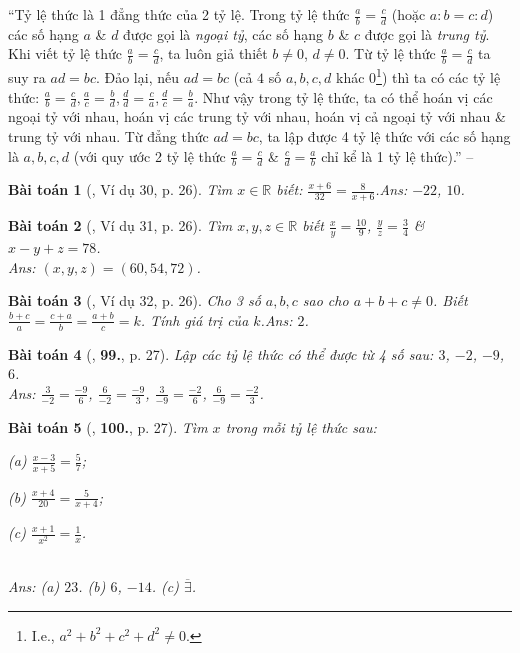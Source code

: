 \documentclass{article}
\numberwithin{equation}{section}
\newtheorem{baitoan}{Bài toán}
\begin{document}
``Tỷ lệ thức là 1 đẳng thức của 2 tỷ lệ. Trong tỷ lệ thức $\frac{a}{b} = \frac{c}{d}$ (hoặc $a:b = c:d$) các số hạng $a$ \& $d$ được gọi là \textit{ngoại tỷ}, các số hạng $b$ \& $c$ được gọi là \textit{trung tỷ}. Khi viết tỷ lệ thức $\frac{a}{b} = \frac{c}{d}$, ta luôn giả thiết $b\ne 0$, $d\ne 0$. Từ tỷ lệ thức $\frac{a}{b} = \frac{c}{d}$ ta suy ra $ad = bc$. Đảo lại, nếu $ad = bc$ (cả $4$ số $a,b,c,d$ khác $0$\footnote{I.e., $a^2 + b^2 + c^2 + d^2\ne 0$.}) thì ta có các tỷ lệ thức: $\frac{a}{b} = \frac{c}{d},\frac{a}{c} = \frac{b}{d},\frac{d}{d} = \frac{c}{a},\frac{d}{c} = \frac{b}{a}$. Như vậy trong tỷ lệ thức, ta có thể hoán vị các ngoại tỷ với nhau, hoán vị các trung tỷ với nhau, hoán vị cả ngoại tỷ với nhau \& trung tỷ với nhau. Từ đẳng thức $ad = bc$, ta lập được 4 tỷ lệ thức với các số hạng là $a,b,c,d$ (với quy ước 2 tỷ lệ thức $\frac{a}{b} = \frac{c}{d}$ \& $\frac{c}{d} = \frac{a}{b}$ chỉ kể là 1 tỷ lệ thức).'' -- \cite[\S4]{Binh_Toan_7_tap_1}

\begin{baitoan}[\cite{Tuyen_Toan_7}, Ví dụ 30, p. 26]
	Tìm $x\in\mathbb{R}$ biết: $\frac{x + 6}{32} = \frac{8}{x + 6}$.\hfill{\sf Ans:} $-22$, $10$.
\end{baitoan}

\begin{baitoan}[\cite{Tuyen_Toan_7}, Ví dụ 31, p. 26]
	Tìm $x,y,z\in\mathbb{R}$ biết $\frac{x}{y} = \frac{10}{9}$, $\frac{y}{z} = \frac{3}{4}$ \& $x - y + z = 78$.\\\mbox{}\hfill{\sf Ans:} $(x,y,z) = (60,54,72)$.
\end{baitoan}

\begin{baitoan}[\cite{Tuyen_Toan_7}, Ví dụ 32, p. 26]
	Cho 3 số $a,b,c$ sao cho $a + b + c\ne 0$. Biết $\frac{b + c}{a} = \frac{c + a}{b} = \frac{a + b}{c} = k$. Tính giá trị của $k$.\hfill{\sf Ans:} $2$.
\end{baitoan}

\begin{baitoan}[\cite{Tuyen_Toan_7}, \textbf{99.}, p. 27]
	Lập các tỷ lệ thức có thể được từ 4 số sau: $3$, $-2$, $-9$, $6$.\\\mbox{}\hfill{\sf Ans:} $\frac{3}{-2} = \frac{-9}{6}$, $\frac{6}{-2} = \frac{-9}{3}$, $\frac{3}{-9} = \frac{-2}{6}$, $\frac{6}{-9} = \frac{-2}{3}$.
\end{baitoan}

\begin{baitoan}[\cite{Tuyen_Toan_7}, \textbf{100.}, p. 27]
	Tìm $x$ trong mỗi tỷ lệ thức sau:
	\begin{enumerate*}
		\item[(a)] $\frac{x - 3}{x + 5} = \frac{5}{7}$;
		\item[(b)] $\frac{x + 4}{20} = \frac{5}{x + 4}$;
		\item[(c)] $\frac{x + 1}{x^2} = \frac{1}{x}$.
	\end{enumerate*}\\\mbox{}\hfill{\sf Ans:} (a) $23$. (b) $6$, $-14$. (c) $\overline{\exists}$.
\end{baitoan}
\end{document}
